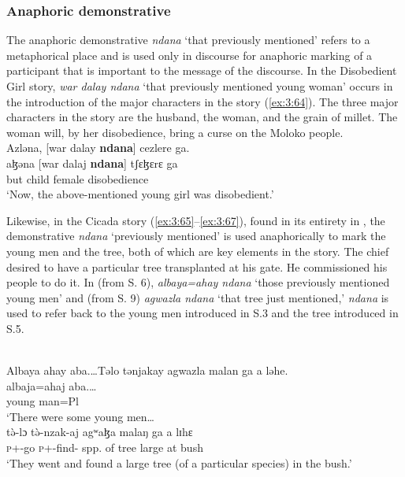 \subsubsection{Anaphoric demonstrative}\label{sec:3.2.2.2}
The anaphoric demonstrative \textit{ndana} ‘that previously mentioned’ refers to a metaphorical place and is used only in discourse for anaphoric marking of a participant that is important to the message of the discourse. In the Disobedient Girl story, \textit{war dalay ndana} ‘that previously mentioned young woman’ occurs in the introduction of the major characters in the story (\ref{ex:3:64}). The three major characters in the story are the husband, the woman, and the grain of millet. The woman will, by her disobedience, bring a curse on the Moloko people. 
\clearpage
\ea \label{ex:3:64}\\
Azləna,  [war  dalay  \textbf{ndana}]  cezlere  ga.\\
\gll  aɮəna  [war   dalaj   \textbf{ndana}]  tʃɛɮɛrɛ         ga\\
      but  child      female    {\DEM}  disobedience   {\ADJ}\\
\glt  ‘Now, the above-mentioned young girl was disobedient.’
\z

Likewise, in the Cicada story (\ref{ex:3:65}--\ref{ex:3:67}), found in its entirety in , the demonstrative \textit{ndana} ‘previously mentioned’ is used anaphorically to mark the young men and the tree, both of which are key elements in the story. The chief desired to have a particular tree transplanted at his gate. He commissioned his people to do it. In  (from S. 6), \textit{albaya=ahay ndana} ‘those previously mentioned young men’ and  (from S. 9)  \textit{agwazla ndana} ‘that tree just mentioned,’ \textit{ndana} is used to refer back to the young men introduced in S.3 and the tree introduced in S.5. 

\ea \label{ex:3:65}\\
Albaya  ahay  aba.\ldots  Təlo  tənjakay  agwazla  malan  ga  a  ləhe.\\
\gll  albaja=ahaj  aba.\ldots \\
      {young man}=Pl  {\EXT}\\
\glt  ‘There were some young men\ldots\\
\medskip
\gll t\`{ə}-lɔ            t\`{ə}-nzak-aj           agʷaɮa    malaŋ     ga   a  lɪhɛ\\
     \textsc{p}+{\PFV}-go   \textsc{p}+{\PFV}-find-{\CL}  {spp. of tree}  large    {\ADJ}  at  bush\\
\glt ‘They went and found a large tree (of a particular species) in the bush.’
\z

